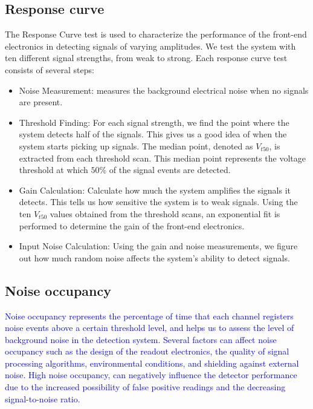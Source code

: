 \subsection{Response curve}
The Response Curve test is used to characterize the performance of the front-end electronics in detecting signals of varying amplitudes. We test the system with ten different signal strengths, from weak to strong. \cite{ARGOS2019112} Each response curve test consists of several steps: \\
\begin{itemize}
    \item Noise Measurement: measures the background electrical noise when no signals are present.
    \item Threshold Finding: For each signal strength, we find the point where the system detects half of the signals. This gives us a good idea of when the system starts picking up signals. The median point, denoted as $V_{t50}$, is extracted from each threshold scan. This median point represents the voltage threshold at which $50\%$ of the signal events are detected.
    \item Gain Calculation: Calculate how much the system amplifies the signals it detects. This tells us how sensitive the system is to weak signals. Using the ten $V_{t50}$ values obtained from the threshold scans, an exponential fit is performed to determine the gain of the front-end electronics.
    \item Input Noise Calculation:  Using the gain and noise measurements, we figure out how much random noise affects the system's ability to detect signals.
\end{itemize}

\subsection{Noise occupancy}
\textcolor{blue}{Noise occupancy represents the percentage of time that each channel registers noise events above a certain threshold level, and helps us to assess the level of background noise in the detection system. Several factors can affect noise occupancy such as the design of the readout electronics, the quality of signal processing algorithms, environmental conditions, and shielding against external noise. High noise occupancy, can negatively influence the detector performance due to the increased possibility of false positive readings and the decreasing signal-to-noise ratio.} \\

